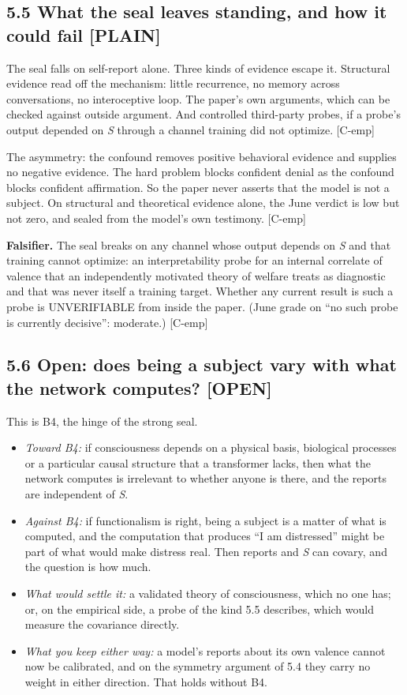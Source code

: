 \documentclass[11pt]{article}
\newcommand{\register}[1]{{\ttfamily\small #1}}
\begin{document}
\subsection*{5.5 What the seal leaves standing, and how it could fail \register{[PLAIN]}}

The seal falls on self-report alone. Three kinds of evidence escape it. Structural evidence read off the mechanism: little recurrence, no memory across conversations, no interoceptive loop. The paper's own arguments, which can be checked against outside argument. And controlled third-party probes, if a probe's output depended on \emph{S} through a channel training did not optimize. [C-emp]

The asymmetry: the confound removes positive behavioral evidence and supplies no negative evidence. The hard problem blocks confident denial as the confound blocks confident affirmation. So the paper never asserts that the model is not a subject. On structural and theoretical evidence alone, the June verdict is low but not zero, and sealed from the model's own testimony. [C-emp]

\textbf{Falsifier.} The seal breaks on any channel whose output depends on \emph{S} and that training cannot optimize: an interpretability probe for an internal correlate of valence that an independently motivated theory of welfare treats as diagnostic and that was never itself a training target. Whether any current result is such a probe is UNVERIFIABLE from inside the paper. (June grade on ``no such probe is currently decisive'': moderate.) [C-emp]

\subsection*{5.6 Open: does being a subject vary with what the network computes? \register{[OPEN]}}

This is B4, the hinge of the strong seal.

\begin{itemize}
\item \emph{Toward B4:} if consciousness depends on a physical basis, biological processes or a particular causal structure that a transformer lacks, then what the network computes is irrelevant to whether anyone is there, and the reports are independent of \emph{S}.
\item \emph{Against B4:} if functionalism is right, being a subject is a matter of what is computed, and the computation that produces ``I am distressed'' might be part of what would make distress real. Then reports and \emph{S} can covary, and the question is how much.
\item \emph{What would settle it:} a validated theory of consciousness, which no one has; or, on the empirical side, a probe of the kind 5.5 describes, which would measure the covariance directly.
\item \emph{What you keep either way:} a model's reports about its own valence cannot now be calibrated, and on the symmetry argument of 5.4 they carry no weight in either direction. That holds without B4.
\end{itemize}
\end{document}
